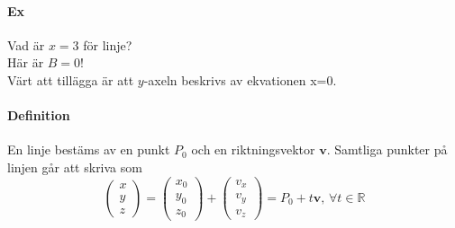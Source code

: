 \paragraph{Ex} Vad är $x=3$ för linje?\\
Här är $B=0$!\\
Värt att tillägga är att $y$-axeln beskrivs av ekvationen x=0.

\paragraph{Definition} En linje bestäms av en punkt $P_{0}$ och en riktningsvektor $\bm{v}$.
Samtliga punkter på linjen går att skriva som 
\begin{equation*}
    \begin{pmatrix}
        x\\y\\z
    \end{pmatrix}=
    \begin{pmatrix}
        x_{0}\\y_{0}\\z_{0}
    \end{pmatrix}+ \begin{pmatrix}
        v_{x}\\v_{y}\\v_{z}
    \end{pmatrix}=P_{0}+t\bm{v}\text{, }\forall t\in\mathbb{R}
\end{equation*}

